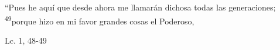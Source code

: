 \documentclass[../../rosario.tex]{subfiles}
\begin{document}
    ``Pues he aquí que desde ahora me llamarán dichosa todas las generaciones; \textsuperscript{49}porque hizo en mi favor grandes cosas el Poderoso,
    \begin{flushright}
    Lc. 1, 48-49          
    \end{flushright}
\end{document}
